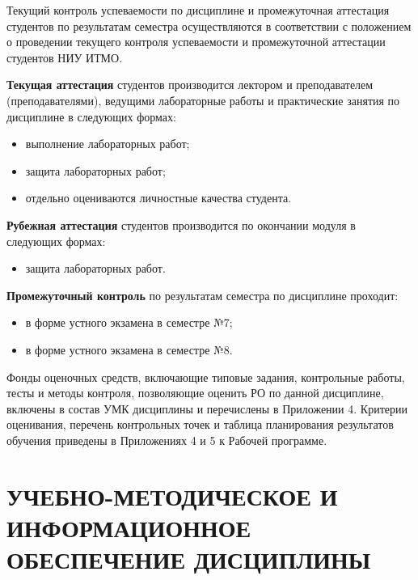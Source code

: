 Текущий контроль успеваемости по дисциплине и промежуточная аттестация студентов по результатам семестра осуществляются в соответствии с положением о проведении текущего контроля успеваемости и промежуточной аттестации студентов НИУ ИТМО.

\textbf{Текущая аттестация} студентов производится лектором и преподавателем (преподавателями), ведущими лабораторные работы и практические занятия по дисциплине в следующих формах:
\begin{itemize}


\item выполнение лабораторных работ;
\item защита лабораторных работ;
\item отдельно оцениваются личностные качества студента.
\end{itemize}

\textbf{Рубежная аттестация} студентов производится по окончании модуля в следующих формах:
\begin{itemize}
\item защита лабораторных работ.
\end{itemize}

\textbf{Промежуточный контроль} по результатам семестра по дисциплине проходит:
\begin{itemize}
\item в форме устного экзамена в семестре №7;\item в форме устного экзамена в семестре №8.
\end{itemize}

Фонды оценочных средств, включающие типовые задания, контрольные работы, тесты и методы контроля, позволяющие оценить РО по данной дисциплине, включены в состав УМК дисциплины и перечислены в Приложении 4.
Критерии оценивания, перечень контрольных точек и таблица планирования результатов обучения приведены в Приложениях 4 и 5 к Рабочей программе.

\newpage
\section{УЧЕБНО-МЕТОДИЧЕСКОЕ И ИНФОРМАЦИОННОЕ ОБЕСПЕЧЕНИЕ ДИСЦИПЛИНЫ}

